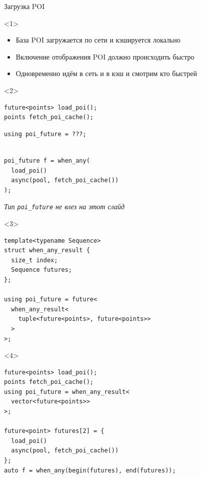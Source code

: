 \documentclass[aspectratio=169,hyperref={unicode},17pt]{beamer}
\begin{document}
\begin{frame}[fragile,t]{Загрузка POI}
\begin{onlyenv}<1>
\begin{itemize}
 \item База POI загружается по сети и кэшируется локально
 \item Включение отображения POI должно происходить быстро
 \item Одновременно идём в сеть и в кэш и смотрим кто быстрей
\end{itemize}
\end{onlyenv}
\begin{onlyenv}<2>
\begin{lstlisting}[style=cppcode,aboveskip=0pt,belowskip=0pt]
future<points> load_poi();
points fetch_poi_cache();
\end{lstlisting}
\begin{lstlisting}[style=cppcode,backgroundcolor=\color{gray!30},aboveskip=0pt,belowskip=0pt]
using poi_future = ???;
\end{lstlisting}
\begin{lstlisting}[style=cppcode,aboveskip=0pt,belowskip=0pt]

poi_future f = when_any(
  load_poi()
  async(pool, fetch_poi_cache())
);
\end{lstlisting}
\textit{\footnotesize{Тип \texttt{poi\_future} не влез на этот слайд}}
\end{onlyenv}
\begin{onlyenv}<3>
\begin{lstlisting}[style=cppcode]
template<typename Sequence>
struct when_any_result {
  size_t index;
  Sequence futures;
};

using poi_future = future<
  when_any_result<
    tuple<future<points>, future<points>>
  >
>;
\end{lstlisting}
\end{onlyenv}
\begin{onlyenv}<4>
\begin{lstlisting}[style=cppcode]
future<points> load_poi();
points fetch_poi_cache();
using poi_future = when_any_result<
  vector<future<points>>
>;

future<point> futures[2] = {
  load_poi()
  async(pool, fetch_poi_cache())
};
auto f = when_any(begin(futures), end(futures));
\end{lstlisting}
\end{onlyenv}
\end{frame}
\end{document}
